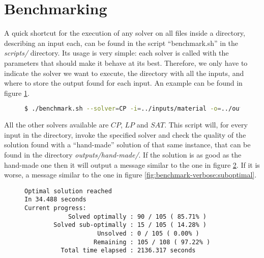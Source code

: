 \section{Benchmarking}
\label{sec:benchmarking}

A quick shortcut for the execution of any solver on all files inside a directory,
describing an input each, can be found in the script ``benchmark.sh''
in the \textit{scripts/} directory. Its usage is very simple: each solver is
called with the parameters that should make it behave at its best. Therefore,
we only have to indicate the solver we want to execute, the directory with
all the inputs, and where to store the output found for each input. An example
can be found in figure \ref{fig:benchmark-example}.

\begin{figure}[H]
\centering
\begin{lstlisting}[language=bash,basicstyle=\centering]
$ ./benchmark.sh --solver=CP -i=../inputs/material -o=../outputs/CP
\end{lstlisting}
\label{fig:benchmark-example}
\end{figure}

All the other solvers available are $CP$, $LP$ and $SAT$. This script will, for
every input in the directory, invoke the specified solver and check the quality of
the solution found with a ``hand-made'' solution of that same instance, that can
be found in the directory \textit{outputs/hand-made/}. If the solution is as good
as the hand-made one then it will output a message similar to the one in figure
\ref{fig:benchmark-verbose:optimal}. If it is worse, a message similar to the
one in figure \ref{fig:benchmark-verbose:suboptimal}.

\begin{figure}[H]
\centering
{\scriptsize
\begin{BVerbatim}
Optimal solution reached
In 34.488 seconds
Current progress:
            Solved optimally : 90 / 105 ( 85.71%
        Solved sub-optimally : 15 / 105 ( 14.28%
                    Unsolved : 0 / 105 ( 0.00%
                   Remaining : 105 / 108 ( 97.22%
          Total time elapsed : 2136.317 seconds
\end{BVerbatim}
}
\label{fig:benchmark-verbose:optimal}
\end{figure}

